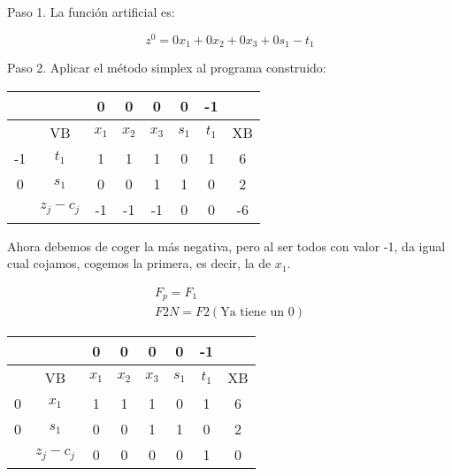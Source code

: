 \begin{itemize}
    Paso 1. La función artificial es: 

    \begin{equation*}
        z^0=0x_1 + 0x_2 + 0x_3 + 0s_1 -t_1
    \end{equation*}

    Paso 2. Aplicar el método simplex al programa construido:

    \begin{table}[H]
    \centering
    \begin{tabular}{|c|c|c|c|c|c|c|c|}
    \hline
    &  & 0 & 0 & 0 & 0 & -1 &\\
    \hline
    & VB & $x_1$ & $x_2$ & $x_3$ & $s_1$ & $t_1$ & XB \\
    \hline
    -1 & $t_1$ & 1 & 1 & 1 & 0 & 1 & 6\\
    \hline
    0 & $s_1$ & 0 & 0 & 1 & 1& 0 &2\\
    \hline
    & $z_j - c_j$ & -1 & -1 & -1 & 0 & 0 &-6\\
    \hline
    \end{tabular}
    \end{table}

    Ahora debemos de coger la más negativa, pero al ser todos con valor -1, da igual cual cojamos, cogemos la primera, es decir, la de $x_1$.

        \begin{align*}
            F_p = F_1\\
            F2N = F2 (\text{Ya tiene un 0})
        \end{align*}
        

    \begin{table}[H]
        \centering
        \begin{tabular}{|c|c|c|c|c|c|c|c|}
        \hline
        &  & 0 & 0 & 0 & 0 & -1 &\\
        \hline
        & VB & $x_1$ & $x_2$ & $x_3$ & $s_1$ & $t_1$ & XB \\
        \hline
        0 & $x_1$ & 1 & 1 & 1 & 0 & 1 & 6\\
        \hline
        0 & $s_1$ & 0 & 0 & 1 & 1& 0 &2\\
        \hline
        & $z_j - c_j$ & 0 & 0& 0 & 0 & 1 &0\\
        \hline
        \end{tabular}
    \end{table}


\end{itemize}
